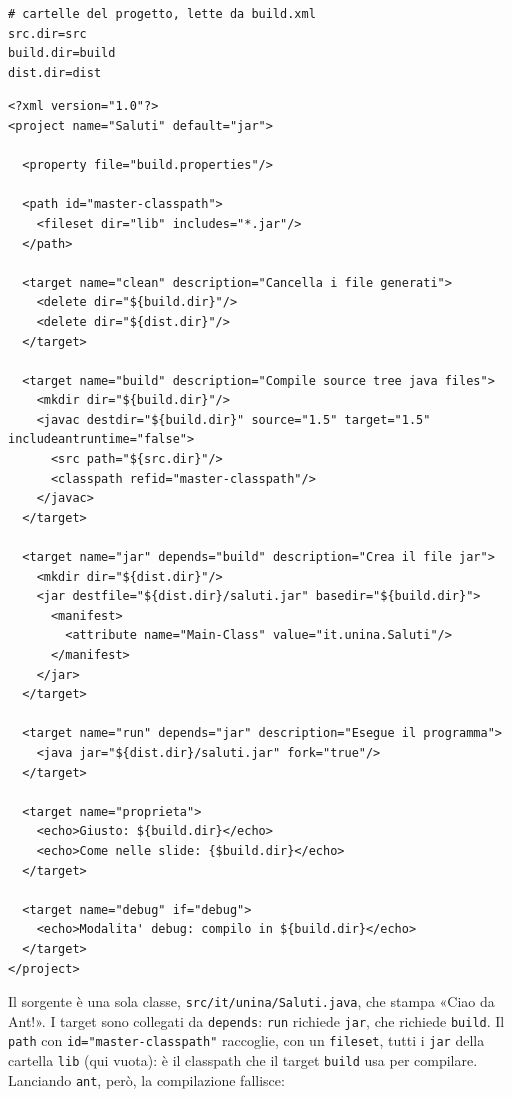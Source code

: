 \begin{lstlisting}[style=conf, name=build.properties]
# cartelle del progetto, lette da build.xml
src.dir=src
build.dir=build
dist.dir=dist
\end{lstlisting}

\begin{lstlisting}[style=xml, name=build.xml]
<?xml version="1.0"?>
<project name="Saluti" default="jar">

  <property file="build.properties"/>

  <path id="master-classpath">
    <fileset dir="lib" includes="*.jar"/>
  </path>

  <target name="clean" description="Cancella i file generati">
    <delete dir="${build.dir}"/>
    <delete dir="${dist.dir}"/>
  </target>

  <target name="build" description="Compile source tree java files">
    <mkdir dir="${build.dir}"/>
    <javac destdir="${build.dir}" source="1.5" target="1.5" includeantruntime="false">
      <src path="${src.dir}"/>
      <classpath refid="master-classpath"/>
    </javac>
  </target>

  <target name="jar" depends="build" description="Crea il file jar">
    <mkdir dir="${dist.dir}"/>
    <jar destfile="${dist.dir}/saluti.jar" basedir="${build.dir}">
      <manifest>
        <attribute name="Main-Class" value="it.unina.Saluti"/>
      </manifest>
    </jar>
  </target>

  <target name="run" depends="jar" description="Esegue il programma">
    <java jar="${dist.dir}/saluti.jar" fork="true"/>
  </target>

  <target name="proprieta">
    <echo>Giusto: ${build.dir}</echo>
    <echo>Come nelle slide: {$build.dir}</echo>
  </target>

  <target name="debug" if="debug">
    <echo>Modalita' debug: compilo in ${build.dir}</echo>
  </target>
</project>
\end{lstlisting}

Il sorgente è una sola classe, \texttt{src/it/unina/Saluti.java}, che stampa «Ciao da Ant!». I target sono collegati
da \texttt{depends}: \texttt{run} richiede \texttt{jar}, che richiede \texttt{build}. Il \texttt{path} con
\texttt{id="master-classpath"} raccoglie, con un \texttt{fileset}, tutti i \texttt{jar} della cartella \texttt{lib}
(qui vuota): è il classpath che il target \texttt{build} usa per compilare. Lanciando \texttt{ant}, però, la
compilazione fallisce:

